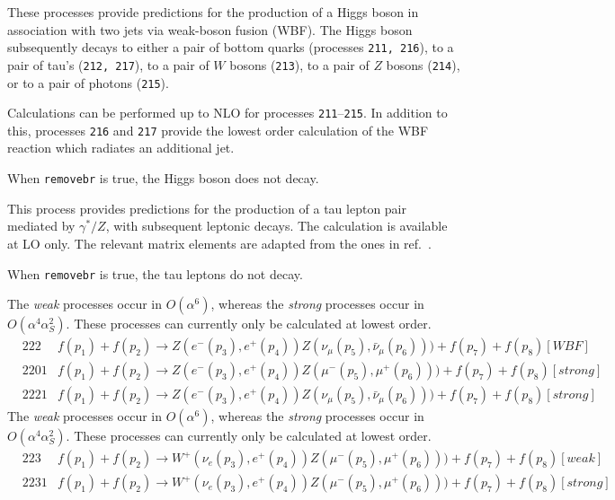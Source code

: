 These processes provide predictions for the production of a Higgs boson in
association with two jets via weak-boson fusion (WBF). The Higgs boson
subsequently decays to either a pair of bottom quarks
(processes {\tt 211, 216}), to a pair of tau's ({\tt 212, 217}), 
to a pair of $W$ bosons ({\tt 213}),
to a pair of $Z$ bosons ({\tt 214}),
or to a pair of photons ({\tt 215}).

Calculations can be performed up to NLO for processes {\tt 211}--{\tt 215}.
In addition to this, processes {\tt 216} and {\tt 217} provide the lowest
order calculation of the WBF reaction which radiates an additional jet. 

When {\tt removebr} is true, the Higgs boson does not decay.

\label{subsec:tautau}

This process provides predictions for the production of a tau lepton
pair mediated by $\gamma^*/Z$, with subsequent leptonic decays. The calculation is available at LO
only. The relevant matrix elements are adapted from the ones in
ref.~\cite{Kleiss:1988xr}.

When {\tt removebr} is true, the tau leptons do not decay.


%
The {\it weak} processes occur in $O(\alpha^6)$, whereas the {\it strong} processes occur in $O(\alpha^4 \alpha_S^2)$.
These processes can currently only be calculated at lowest order.
\begin{eqnarray}
&222 &  f(p_1)+f(p_2) \to Z(e^-(p_3),e^+(p_4))Z(\nu_\mu(p_5),\bar{\nu}_\mu(p_6)))+f(p_7)+f(p_8) [WBF]  \nonumber \\
&2201 & f(p_1)+f(p_2) \to Z(e^-(p_3),e^+(p_4))Z(\mu^-(p_5),\mu^+(p_6)))+f(p_7)+f(p_8) [strong] \nonumber \\
&2221 & f(p_1)+f(p_2) \to Z(e^-(p_3),e^+(p_4))Z(\nu_\mu(p_5),\bar{\nu}_\mu(p_6)))+f(p_7)+f(p_8) [strong]  \nonumber
\end{eqnarray}
%
The {\it weak} processes occur in $O(\alpha^6)$, whereas the {\it strong} processes occur in $O(\alpha^4 \alpha_S^2)$.
These processes can currently only be calculated at lowest order.
\begin{eqnarray}
& 223  & f(p_1)+f(p_2) \to W^+(\nu_e(p_3),e^+(p_4))Z(\mu^-(p_5),\mu^+(p_6)))+f(p_7)+f(p_8) [weak]  \nonumber \\
& 2231 & f(p_1)+f(p_2) \to W^+(\nu_e(p_3),e^+(p_4))Z(\mu^-(p_5),\mu^+(p_6)))+f(p_7)+f(p_8) [strong]  \nonumber
\end{eqnarray}

